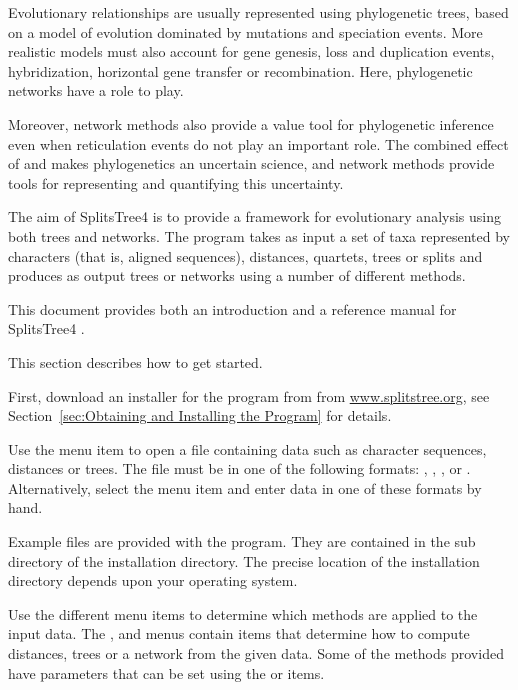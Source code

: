 \documentclass[11pt]{article}
\def\SplitsTree{{\sf SplitsTree4 }}
\begin{document}
Evolutionary relationships are usually represented using phylogenetic trees,
based on a model of evolution dominated by mutations and speciation
events. More realistic models must also account for gene genesis, loss and
duplication events, hybridization, horizontal gene transfer or
recombination. Here, phylogenetic networks have a role to play.

Moreover, network methods also provide a value tool for phylogenetic
inference even when reticulation events do not play an important role.
The combined effect of  and
 makes
phylogenetics an uncertain science, and network methods provide tools for
representing and quantifying this uncertainty.

The aim of \SplitsTree is to provide a framework for evolutionary
analysis using both trees and networks. The program takes as input
a set of taxa represented by characters (that is, aligned sequences),
distances, quartets, trees or splits and produces as output trees or
networks using a number of different methods.

This document provides both an introduction and a reference manual for
\SplitsTree.

\pagebreak

This section describes how to get started.

First, download an installer for the program from
from \href{http://www.splitstree.org}{www.splitstree.org},
see Section~\ref{sec:Obtaining and Installing the Program}
for details.

Use the  menu item to open a file containing
data such as character sequences, distances or trees.
The file must be in one of the following formats:
, , ,  or
.
Alternatively, select the  menu item
 and enter data in one of these formats by hand.

Example files are provided with the program. They are contained in the
 sub directory of the installation directory. The precise
location of the installation directory depends upon your operating system.

Use the different menu items to determine which methods are applied
to the input data. The ,  and 
menus contain items that determine how to compute distances,
trees or a network from the given data. Some of the methods provided
have parameters that can be set using the
or
 items.
\end{document}
